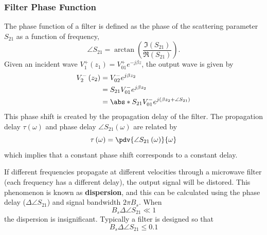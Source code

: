 \documentclass{article}
\begin{document}
\subsubsection{Filter Phase Function}
The phase function of a filter is defined as the phase of the
scattering parameter \(S_{21}\) as a function of frequency,
\begin{equation*}
    \angle S_{21} = \arctan{\left( \frac{\Im{\left( S_{21} \right)}}{\Re{\left( S_{21} \right)}} \right)}.
\end{equation*}
Given an incident wave \(V_1^+ \left( z_1 \right) = V_{01}^+ e^{-j \beta z}\),
the output wave is given by
\begin{align*}
    V_2^- \left( z_2 \right) & = V_{02}^- e^{j \beta z_2}                                              \\
                             & = S_{21} V_{01}^- e^{j \beta z_2}                                       \\
                             & = \abs*{S_{21}} V_{01}^- e^{j \left( \beta z_2 + \angle S_{21} \right)}
\end{align*}
This phase shift is created by the propagation delay of the filter.
The propagation delay \(\tau\left( \omega \right)\) and phase delay
\(\angle S_{21}\left( \omega \right)\) are related by
\begin{equation*}
    \tau\left( \omega \right) = \pdv{\angle S_{21}\left( \omega \right)}{\omega}
\end{equation*}
which implies that a constant phase shift corresponds to a constant delay.

If different frequencies propagate at different velocities through a
microwave filter (each frequency has a different delay), the output
signal will be distored. This phenomenon is known as
\textbf{dispersion}, and this can be calculated using the phase delay
(\(\Delta \angle S_{21}\)) and signal bandwidth \(2\pi B_s\). When
\begin{equation*}
    B_s \Delta \angle S_{21} \ll 1
\end{equation*}
the dispersion is insignificant. Typically a filter is designed so that
\begin{equation*}
    B_s \Delta \angle S_{21} \leqslant 0.1
\end{equation*}
\end{document}

